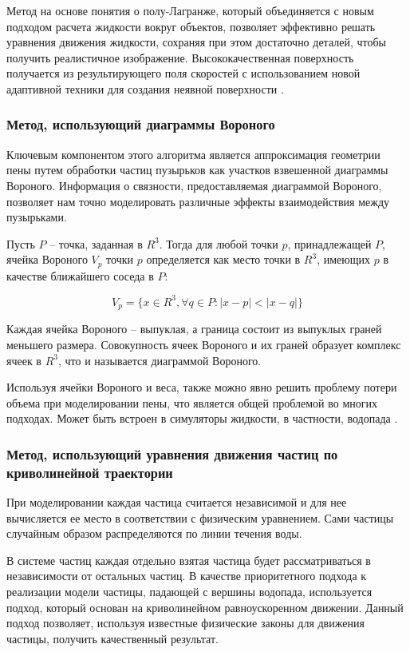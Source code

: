 Метод на основе понятия о полу-Лагранже, который объединяется с новым подходом расчета жидкости вокруг объектов, позволяет эффективно решать уравнения движения жидкости, сохраняя при этом достаточно деталей, чтобы получить реалистичное изображение. Высококачественная поверхность получается из результирующего поля скоростей с использованием новой адаптивной техники для создания неявной поверхности  \cite{semi-lagrangian-particle}.

\subsubsection{Метод, использующий диаграммы Вороного}

Ключевым компонентом этого алгоритма является аппроксимация геометрии пены путем обработки частиц пузырьков как участков взвешенной диаграммы Вороного. Информация о связности, предоставляемая диаграммой Вороного, позволяет нам точно моделировать различные эффекты взаимодействия между пузырьками.

Пусть $P$ -- точка, заданная в $R^3$. Тогда для любой точки $p$, принадлежащей $P$, ячейка Вороного $V_p$ точки $p$ определяется как место точки в $R^3$, имеющих $p$ в качестве ближайшего соседа в $P$:

\begin{equation}
    V_p = \{x \in R^3, \forall q \in P: |x - p| < |x - q|\}
\end{equation}

Каждая ячейка Вороного -- выпуклая, а граница состоит из выпуклых граней меньшего размера. Совокупность ячеек Вороного и их граней образует комплекс ячеек в $R^3$, что и называется диаграммой Вороного.

Используя ячейки Вороного и веса, также можно явно решить проблему потери объема при моделировании пены, что является общей проблемой во многих подходах. Может быть встроен в симуляторы жидкости, в частности, водопада \cite{voronov-diagram-particle}.

\subsubsection{Метод, использующий уравнения движения частиц по криволинейной траектории}

При моделировании каждая частица считается независимой и для нее вычисляется ее место в соответствии с физическим уравнением. Сами частицы случайным образом распределяются по линии течения воды.

В системе частиц каждая отдельно взятая частица будет рассматриваться в независимости от остальных частиц. В качестве приоритетного подхода к реализации модели частицы, падающей с вершины водопада, используется подход, который основан на криволинейном равноускоренном движении. Данный подход позволяет, используя известные физические законы для движения частицы, получить качественный результат.

